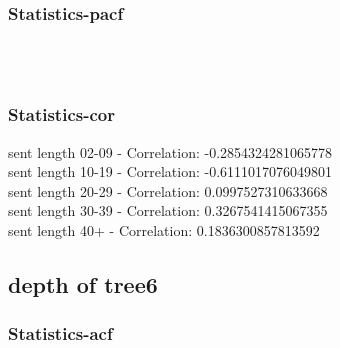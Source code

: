 \documentclass{article}%
\begin{document}
%
\newpage%
\subsubsection{Statistics{-}pacf}%
\label{ssubsec:Statistics{-}pacf}%


\begin{figure}[ht]%
\centering%
\setlength{\abovecaptionskip}{-35pt}%
%
%
\\%
%
%
\\%
%
\end{figure}

%
\newpage%
\subsubsection{Statistics{-}cor}%
\label{ssubsec:Statistics{-}cor}%
\noindent%
sent length 02-09 - Correlation: -0.2854324281065778\\%
sent length 10-19 - Correlation: -0.6111017076049801\\%
sent length 20-29 - Correlation: 0.0997527310633668\\%
sent length 30-39 - Correlation: 0.3267541415067355\\%
sent length 40+ - Correlation: 0.1836300857813592\\

%
\newpage

%
\subsection{depth of tree6}%
\label{subsec:depthoftree6}%
\subsubsection{Statistics{-}acf}%
\label{ssubsec:Statistics{-}acf}%
\end{document}
